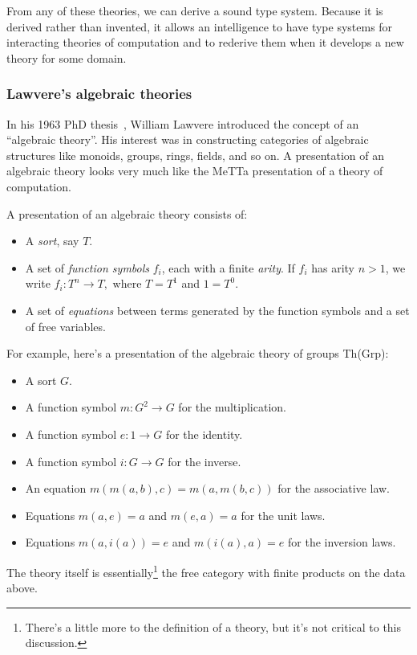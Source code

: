 \documentclass{article}
\begin{document}
From any of these theories, we can derive a sound type system.  Because it is derived rather than invented, it allows an intelligence to have type systems for interacting theories of computation and to rederive them when it develops a new theory for some domain.

\subsubsection{Lawvere's algebraic theories}

In his 1963 PhD thesis~\cite{Lawvere1963}, William Lawvere introduced the concept of an ``algebraic theory''.  His interest was in constructing categories of algebraic structures like monoids, groups, rings, fields, and so on.  A presentation of an algebraic theory looks very much like the MeTTa presentation of a theory of computation.

A presentation of an algebraic theory consists of:
\begin{itemize}
    \item A {\em sort}, say $T.$
    \item A set of {\em function symbols} $f_i$, each with a finite {\em arity}.  If $f_i$ has arity $n > 1$, we write $f_i:T^n \to T,$ where $T = T^1$ and $1 = T^0.$
    \item A set of {\em equations} between terms generated by the function symbols and a set of free variables.
\end{itemize}
For example, here's a presentation of the algebraic theory of groups Th(Grp):
\begin{itemize}
    \item A sort $G.$
    \item A function symbol $m\colon G^2 \to G$ for the multiplication.
    \item A function symbol $e\colon 1 \to G$ for the identity.
    \item A function symbol $i\colon G \to G$ for the inverse.
    \item An equation $m(m(a,b),c) = m(a, m(b,c))$ for the associative law.
    \item Equations $m(a, e) = a$ and $m(e, a) = a$ for the unit laws.
    \item Equations $m(a, i(a)) = e$ and $m(i(a), a) = e$ for the inversion laws.
\end{itemize}
The theory itself is essentially\footnote{There's a little more to the definition of a theory, but it's not critical to this discussion.} the free category with finite products on the data above.
\end{document}

